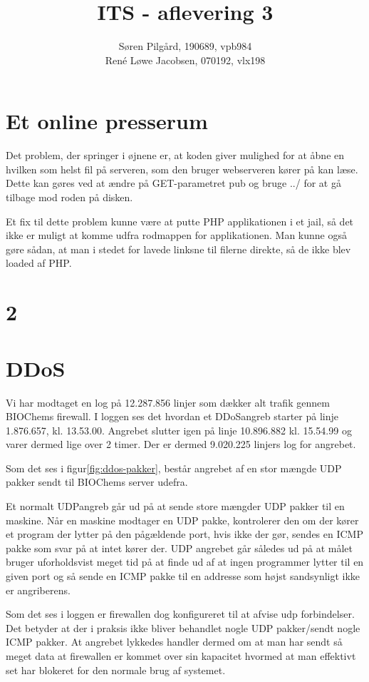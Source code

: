 \documentclass[10pt,a4paper,danish]{article}
\title{ITS - aflevering 3}
\author{Søren Pilgård, 190689, vpb984\\
  René Løwe Jacobsen, 070192, vlx198}
\begin{document}
\maketitle
\newpage

\tableofcontents
\newpage

\section{Et online presserum}
Det problem, der springer i øjnene er, at koden giver mulighed for at åbne en
hvilken som helst fil på serveren, som den bruger webserveren kører på kan læse.
Dette kan gøres ved at ændre på GET-parametret pub og bruge ../ for at gå tilbage
mod roden på disken.

Et fix til dette problem kunne være at putte PHP applikationen i et jail, så det
ikke er muligt at komme udfra rodmappen for applikationen.
Man kunne også gøre sådan, at man i stedet for lavede linksne til filerne
direkte, så de ikke blev loaded af PHP.


\section{2}

\section{DDoS}
Vi har modtaget en log på 12.287.856 linjer som dækker alt trafik gennem
BIOChems firewall.
I loggen ses det hvordan et DDoSangreb starter på linje 1.876.657, kl. 13.53.00.
Angrebet slutter igen på linje 10.896.882 kl. 15.54.99 og varer dermed lige over 2
timer.
Der er dermed 9.020.225 linjers log for angrebet.

Som det ses i figur\ref{fig:ddos-pakker}, består angrebet af en stor mængde UDP
pakker sendt til BIOChems server udefra.

Et normalt UDPangreb går ud på at sende store mængder UDP pakker til en maskine.
Når en maskine modtager en UDP pakke, kontrolerer den om der kører et program
der lytter på den pågældende port, hvis ikke der gør, sendes en ICMP pakke som
svar på at intet kører der. UDP angrebet går således ud på at målet bruger
uforholdsvist meget tid på at finde ud af at ingen programmer lytter til en
given port og så sende en ICMP pakke til en addresse som højst sandsynligt ikke
er angriberens.

Som det ses i loggen er firewallen dog konfigureret til at afvise udp
forbindelser.
Det betyder at der i praksis ikke bliver behandlet nogle UDP pakker/sendt nogle
ICMP pakker. At angrebet lykkedes handler dermed om at man har sendt så meget
data at firewallen er kommet over sin kapacitet hvormed at man effektivt set har
blokeret for den normale brug af systemet.
\end{document}
